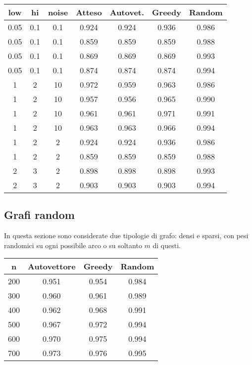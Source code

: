 \documentclass{article}
\begin{document}
\begin{multicols}{2}
\begin{center}
    \begin{tabular}{|c|c|c|c|c|c|c|}
        \hline
        low & hi & noise & Atteso & Autovet. & Greedy & Random \\
        \hline
        \hline
        0.05 & 0.1 & 0.1 & 0.924 & 0.924 & 0.936 & 0.986 \\
        0.05 & 0.1 & 0.1 & 0.859 & 0.859 & 0.859 & 0.988 \\
        0.05 & 0.1 & 0.1 & 0.869 & 0.869 & 0.869 & 0.993 \\
        0.05 & 0.1 & 0.1 & 0.874 & 0.874 & 0.874 & 0.994 \\
        \hline
        \hline
        1 & 2 & 10 & 0.972 & 0.959 & 0.963 & 0.986 \\
        1 & 2 & 10 & 0.957 & 0.956 & 0.965 & 0.990 \\
        1 & 2 & 10 & 0.961 & 0.961 & 0.971 & 0.991 \\
        1 & 2 & 10 & 0.963 & 0.963 & 0.966 & 0.994 \\
        \hline
        \hline
        1 & 2 & 2 & 0.924 & 0.924 & 0.936 & 0.986 \\
        1 & 2 & 2 & 0.859 & 0.859 & 0.859 & 0.988 \\
        2 & 3 & 2 & 0.898 & 0.898 & 0.898 & 0.993 \\
        2 & 3 & 2 & 0.903 & 0.903 & 0.903 & 0.994 \\
        \hline
    \end{tabular}
\end{center}

\subsection{Grafi random}

In questa sezione sono considerate due tipologie di grafo: densi e sparsi,
con pesi randomici su ogni possibile arco o su soltanto $m$ di questi.

\begin{center}
    \begin{tabular}{|c|c|c|c|}
        \hline
        n & Autovettore & Greedy & Random \\
        \hline
        \hline
        200 & 0.951 & 0.954 & 0.984 \\
        300 & 0.960 & 0.961 & 0.989 \\
        400 & 0.962 & 0.968 & 0.991 \\
        500 & 0.967 & 0.972 & 0.994 \\
        600 & 0.970 & 0.975 & 0.994 \\
        700 & 0.973 & 0.976 & 0.995 \\
        \hline
    \end{tabular}
\end{center}


\end{multicols}
\end{document}
